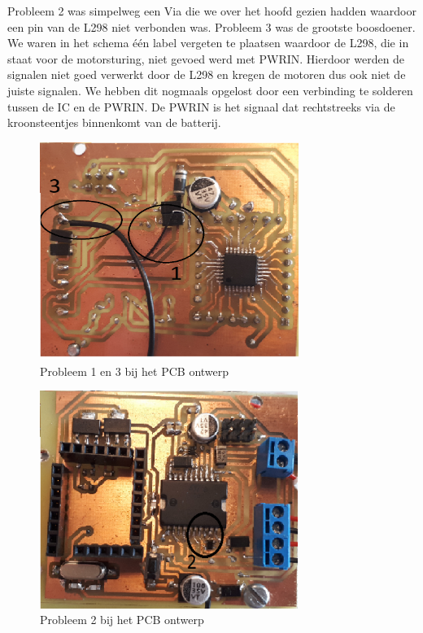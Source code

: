 Probleem 2 was simpelweg een Via die we over het hoofd gezien hadden waardoor een pin van de L298 niet verbonden was. 
Probleem 3 was de grootste boosdoener. We waren in het schema \'e\'en label vergeten te plaatsen waardoor de L298, die in staat voor de motorsturing, niet gevoed werd met PWRIN. Hierdoor werden de signalen niet goed verwerkt door de L298 en kregen de motoren dus ook niet de juiste signalen. We hebben dit nogmaals opgelost door een verbinding te solderen tussen de IC en de PWRIN. De PWRIN is het signaal dat rechtstreeks via de kroonsteentjes binnenkomt van de batterij.
\begin{figure}[h]
\centering
\includegraphics[width=0.75\textwidth]{PCBProblemenVoorkant.png}
\caption{Probleem 1 en 3 bij het PCB ontwerp}
\label{fig:prob1}
\end{figure}

\begin{figure}[h]
\centering
\includegraphics[width=0.75\textwidth]{PCBProblemenAchterkant.png}
\caption{Probleem 2 bij het PCB ontwerp}
\label{fig:prob3}
\end{figure}



